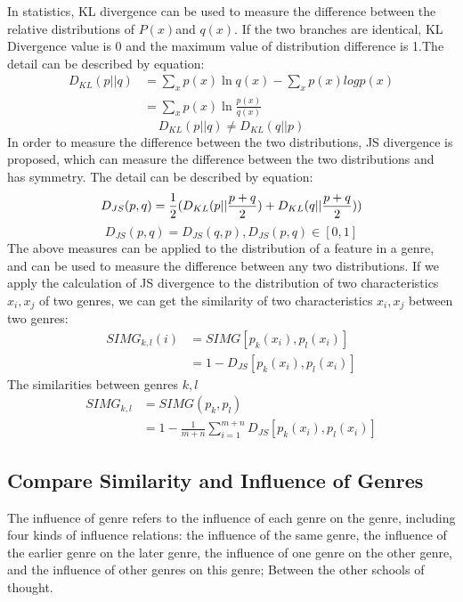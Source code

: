\documentclass[conference]{IEEEtran}
\begin{document}
In statistics, KL divergence can be used to measure the difference between the relative distributions of $P (x) $and $q (x) $. If the two branches are identical, KL Divergence value is 0 and the maximum value of distribution difference is 1.The detail can be described by equation:
\begin{equation}\label{eq:KL}
	\begin{aligned}
		D_{KL}(p||q)
		&=\sum_{x}p(x)\ln q(x)-\sum_{x}p(x)logp(x)	\\
		&=\sum_{x}p(x)\ln\frac{p(x)}{q(x)}
		\end{aligned}
\end{equation}
\[D_{KL}(p||q)\neq D_{KL}(q||p)\]
In order to measure the difference between the two distributions, JS divergence is proposed\cite{bullmore2009complex}, which can measure the difference between the two distributions and has symmetry.
The detail can be described by equation:
\begin{equation}\label{eq:JS}
D_{JS}(p,q)=\frac{1}{2}( D_{KL}(p||\frac{p+q}{2})+D_{KL}(q||\frac{p+q}{2}))\\
\end{equation}
\[D_{JS}(p,q)= D_{JS}(q,p),D_{JS}(p,q)\in [0,1] \]
The above measures can be applied to the distribution of a feature in a genre, and can be used to measure the difference between any two distributions.
If we apply the calculation of JS divergence to the distribution of two characteristics $x_i,x_j$ of two genres, we can get the similarity of two characteristics $x_i,x_j$ between two genres:
\begin{equation}\label{eq:SIMG 1}
	\begin{aligned}
		SIMG_{k,l}(i)&=SIMG[p_k(x_i),p_l(x_i)]\\
		&=1-D_{JS}[p_k(x_i),p_l(x_i)]
	\end{aligned}
\end{equation}
The similarities between genres $k, l $
\begin{equation}\label{eq:SIMG 2}
	\begin{aligned}
		SIMG_{k,l}&=SIMG(p_k,p_l)\\
		&=1-\frac{1}{m+n} \sum_{i=1}^{m+n} D_{JS}[p_k(x_i),p_l(x_i)]
	\end{aligned}
\end{equation}
\subsection{Compare Similarity and Influence of Genres}
The influence of genre refers to the influence of each genre on the genre, including four kinds of influence relations: the influence of the same genre, the influence of the earlier genre on the later genre, the influence of one genre on the other genre, and the influence of other genres on this genre; Between the other schools of thought.
\end{document}
